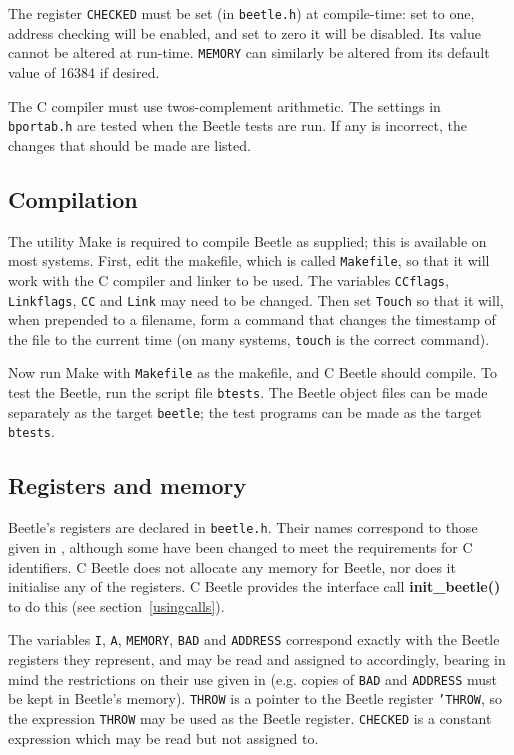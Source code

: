 The register {\tt CHECKED} must be set (in {\tt beetle.h}) at compile-time:
set to one, address checking will be enabled, and set to zero it will be
disabled. Its value cannot be altered at run-time. {\tt MEMORY} can similarly
be altered from its default value of 16384 if desired.

The C compiler must use twos-complement arithmetic. The settings in {\tt
bportab.h} are tested when the Beetle tests are run. If any is incorrect, the
changes that should be made are listed.


\subsection{Compilation}

The utility Make is required to compile Beetle as supplied; this is available
on most systems. First, edit the makefile, which is called {\tt Makefile}, so
that it will work with the C compiler and linker to be used. The variables
{\tt CCflags}, {\tt Linkflags}, {\tt CC} and {\tt Link} may need to be
changed. Then set {\tt Touch} so that it will, when prepended to a filename,
form a command that changes the timestamp of the file to the current time (on
many systems, {\tt touch} is the correct command).

Now run Make with {\tt Makefile} as the makefile, and C Beetle should
compile. To test the Beetle, run the script file {\tt btests}. The Beetle
object files can be made separately as the target {\tt beetle}; the test
programs can be made as the target {\tt btests}.


\subsection{Registers and memory}

Beetle's registers are declared in {\tt beetle.h}. Their names correspond to
those given in \cite[section~A.2.1]{beetle}, although some have been changed
to meet the requirements for C identifiers. C Beetle does not allocate any
memory for Beetle, nor does it initialise any of the registers. C Beetle
provides the interface call {\bf init\_beetle()} to do this (see
section~\ref{usingcalls}).

The variables {\tt I}, {\tt A}, {\tt MEMORY}, {\tt BAD} and {\tt ADDRESS}
correspond exactly with the Beetle registers they represent, and may be read
and assigned to accordingly, bearing in mind the restrictions on their use
given in \cite{beetledis} (e.g. copies of {\tt BAD} and {\tt ADDRESS} must be
kept in Beetle's memory). {\tt THROW} is a pointer to the Beetle register
{\tt 'THROW}, so the expression {\tt *THROW} may be used as the Beetle
register. {\tt CHECKED} is a constant expression which may be read but not
assigned to.

